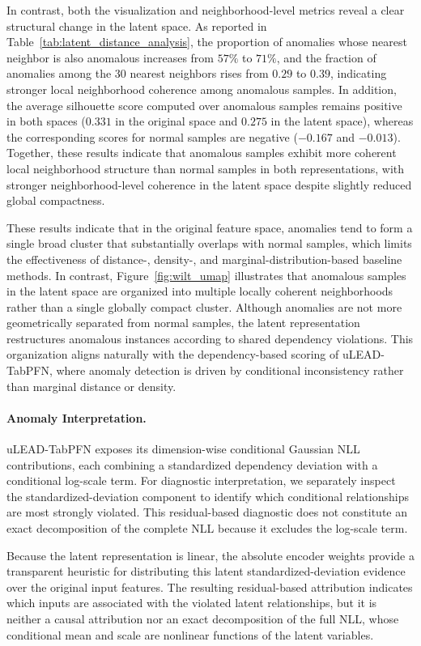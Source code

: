 \documentclass[conference]{IEEEtran}
\begin{document}
	In contrast, both the visualization and neighborhood-level metrics reveal a clear structural change in the latent space. As reported in Table~\ref{tab:latent_distance_analysis}, the proportion of anomalies whose nearest neighbor is also anomalous increases from $57\%$ to $71\%$, and the fraction of anomalies among the 30 nearest neighbors rises from $0.29$ to $0.39$, indicating stronger local neighborhood coherence among anomalous samples. In addition, the average silhouette score computed over anomalous samples remains positive in both spaces ($0.331$ in the original space and $0.275$ in the latent space), whereas the corresponding scores for normal samples are negative ($-0.167$ and $-0.013$). Together, these results indicate that anomalous samples exhibit more coherent local neighborhood structure than normal samples in both representations, with stronger neighborhood-level coherence in the latent space despite slightly reduced global compactness.
	
	These results indicate that in the original feature space, anomalies tend to form a single broad cluster that substantially overlaps with normal samples, which limits the effectiveness of distance-, density-, and marginal-distribution-based baseline methods. In contrast, Figure~\ref{fig:wilt_umap} illustrates that anomalous samples in the latent space are organized into multiple locally coherent neighborhoods rather than a single globally compact cluster. Although anomalies are not more geometrically separated from normal samples, the latent representation restructures anomalous instances according to shared dependency violations. This organization aligns naturally with the dependency-based scoring of uLEAD-TabPFN, where anomaly detection is driven by conditional inconsistency rather than marginal distance or density.
	
	
	\paragraph{Anomaly Interpretation.}
	uLEAD-TabPFN exposes its dimension-wise conditional Gaussian NLL contributions, each combining a standardized dependency deviation with a conditional log-scale term. For diagnostic interpretation, we separately inspect the standardized-deviation component to identify which conditional relationships are most strongly violated. This residual-based diagnostic does not constitute an exact decomposition of the complete NLL because it excludes the log-scale term.
	
	Because the latent representation is linear, the absolute encoder weights provide a transparent heuristic for distributing this latent standardized-deviation evidence over the original input features. The resulting residual-based attribution indicates which inputs are associated with the violated latent relationships, but it is neither a causal attribution nor an exact decomposition of the full NLL, whose conditional mean and scale are nonlinear functions of the latent variables.
	
\end{document}
